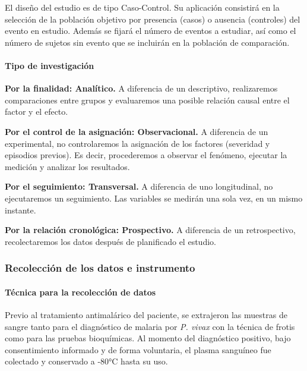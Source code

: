 \documentclass[
  a4paper]{article}
\let\oldparagraph\paragraph
\renewcommand{\paragraph}[1]{\oldparagraph{#1}\mbox{}}
\begin{document}
El diseño del estudio es de tipo Caso-Control. Su aplicación consistirá
en la selección de la población objetivo por presencia (casos) o
ausencia (controles) del evento en estudio. Además se fijará el número
de eventos a estudiar, así como el número de sujetos sin evento que se
incluirán en la población de comparación.

\hypertarget{tipo-de-investigaciuxf3n}{%
\paragraph{Tipo de investigación}\label{tipo-de-investigaciuxf3n}}

\textbf{Por la finalidad: Analítico.} A diferencia de un descriptivo,
realizaremos comparaciones entre grupos y evaluaremos una posible
relación causal entre el factor y el efecto.

\textbf{Por el control de la asignación: Observacional.} A diferencia de
un experimental, no controlaremos la asignación de los factores
(severidad y episodios previos). Es decir, procederemos a observar el
fenómeno, ejecutar la medición y analizar los resultados.

\textbf{Por el seguimiento: Transversal.} A diferencia de uno
longitudinal, no ejecutaremos un seguimiento. Las variables se medirán
una sola vez, en un mismo instante.

\textbf{Por la relación cronológica: Prospectivo.} A diferencia de un
retrospectivo, recolectaremos los datos después de planificado el
estudio.

\hypertarget{recolecciuxf3n-de-los-datos-e-instrumento}{%
\subsubsection{Recolección de los datos e
instrumento}\label{recolecciuxf3n-de-los-datos-e-instrumento}}

\hypertarget{tuxe9cnica-para-la-recolecciuxf3n-de-datos}{%
\paragraph{Técnica para la recolección de
datos}\label{tuxe9cnica-para-la-recolecciuxf3n-de-datos}}

Previo al tratamiento antimalárico del paciente, se extrajeron las
muestras de sangre tanto para el diagnóstico de malaria por \emph{P.
vivax} con la técnica de frotis como para las pruebas bioquímicas. Al
momento del diagnóstico positivo, bajo consentimiento informado y de
forma voluntaria, el plasma sanguíneo fue colectado y conservado a -80°C
hasta su uso.
\end{document}
